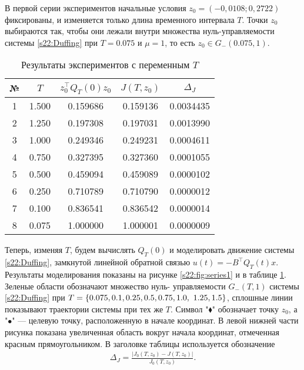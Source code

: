 \documentclass[../main.tex]{subfiles}
\begin{document}
В первой серии экспериментов начальные условия $z_0 = (-0,0108; 0,2722)$ 
фиксированы, и изменяется только длина временного интервала $T$.
Точки $z_0 $ выбираются так, чтобы они лежали внутри множества нуль-управляемости системы 
\eqref{s22:Duffing} при $T = 0.075$ и $\mu = 1$, то есть $z_0 \in G_{-}(0.075,1)$.

\begin{table}
\caption{Результаты экспериментов с переменным $T$}
\label{s22:ExampleTable1}
\begin{center}
\begin{tabular}{c|c|c|c|c}
    № & $T$   &  $z_0^{\top} Q_T(0) z_0$   & $ J(T,z_0) $  & $ 
    \Delta_J $   \\ \hline 
    1 & 1.500 & 0.159686  & 0.159136 & 0.0034435   \\ \hline
     2 & 1.250 & 0.197308  & 0.197031 & 0.0013990   \\ \hline
     3 & 1.000 & 0.249346  & 0.249231 & 0.0004611  \\ \hline
     4 & 0.750 & 0.327395  & 0.327360 & 0.0001055   \\ \hline
     5 & 0.500 & 0.459094 & 0.459089 & 0.0000102   \\ \hline
     6 & 0.250 & 0.710789  & 0.710790 & 0.0000012   \\ \hline
     7 & 0.100 & 0.836541  & 0.836542 & 0.0000014   \\ \hline
     8 & 0.075 & 1.000000  & 1.000001 & 0.0000009   \\ \hline
\end{tabular}
\end{center}
\end{table}

Теперь, изменяя $T$, будем вычислять $Q_T(0)$ и моделировать движение системы \eqref{s22:Duffing}, замкнутой линейной обратной связью $u(t) = -B^{\top}Q_T(t)x$.
Результаты моделирования показаны на рисунке \ref{s22:fig:series1} и в таблице 
\ref{s22:ExampleTable1}.
Зеленые области обозначают множество нуль- управляемости 
$G_{-}(T,1)$ системы \eqref{s22:Duffing} при $T = \{0.075, 0.1, 0.25, 0.5, 0.75, 1.0,\\\ 1.25, 1.5\}$, сплошные линии показывают траектории системы при тех же $T$. 
Символ "$\blacklozenge$" обозначает точку $z_0$, а "$\bullet$" --- целевую точку, расположенную в начале координат.  
В левой нижней части рисунка показана увеличенная область вокруг начала координат, отмеченная красным прямоугольником.
В заголовке таблицы используется обозначение  
\begin{gather*}
    \Delta_J = \frac{| J_0(T,z_0) - J(T,z_0) |}{J_0(T,z_0)}.
\end{gather*}
\end{document}
